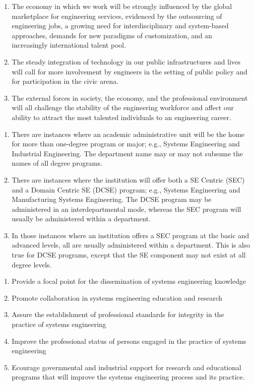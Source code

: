 \begin{enumerate}
	\item The economy in which we work will be strongly influenced by the global marketplace for engineering services, evidenced by the outsourcing of engineering jobs, a growing need for interdisciplinary and system-based approaches, demands for new paradigms of customization, and an increasingly international talent pool.
	\item The steady integration of technology in our public infrastructures and lives will call for more involvement by engineers in the setting of public policy and for participation in the civic arena.
	\item The external forces in society, the economy, and the professional environment will all challenge the stability of the engineering workforce and affect our ability to attract the most talented individuals to an engineering career.
\end{enumerate}

\begin{enumerate}
	\item There are instances where an academic administrative unit will be the home for more than one-degree program or major; e.g., Systems Engineering and Industrial Engineering. The department name may or may not subsume the names of all degree programs.
	\item There are instances where the institution will offer both a SE Centric (SEC) and a Domain Centric SE (DCSE) program; e.g., Systems Engineering and Manufacturing Systems Engineering. The DCSE program may be administered in an interdepartmental mode, whereas the SEC program will usually be administered within a department.
	\item In those instances where an institution offers a SEC program at the basic and advanced levels, all are usually administered within a department. This is also true for DCSE programs, except that the SE component may not exist at all degree levels.
\end{enumerate}

\begin{enumerate}
	\item Provide a focal point for the dissemination of systems engineering knowledge
	\item Promote collaboration in systems engineering education and research
	\item Assure the establishment of professional standards for integrity in the practice of systems engineering
	\item Improve the professional status of persons engaged in the practice of systems engineering
	\item Ecourage governmental and industrial support for research and educational programs that will improve the systems engineering process and its practice. 
\end{enumerate}

